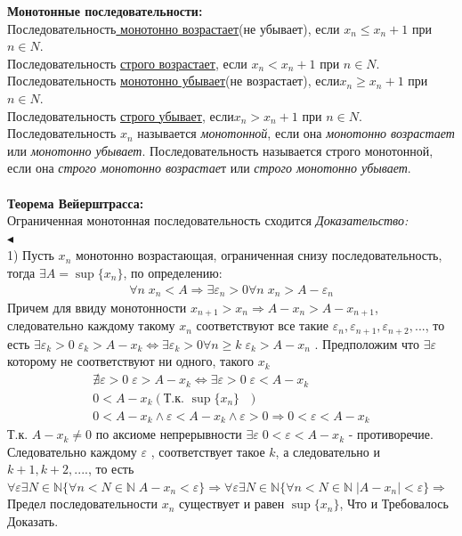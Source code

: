 \textbf{Монотонные последовательности:}\\
Последовательность\underline{ монотонно возрастает}(не убывает), если $ x_n \leqslant x_n+1 $ при $ n \in N $. \\
Последовательность
\underline{строго возрастает}, если $ x_n < x_n+1 $ при $ n \in N $. \\
Последовательность \underline{монотонно убывает}(не возрастает), если$  x_n \geqslant x_n+1 $ при $ n \in N $. \\
Последовательность \underline{строго убывает}, если$  x_n > x_n+1 $ при $ n \in N $. 
\\
Последовательность $ x_n $ называется \textit{монотонной}, если она \textit{монотонно возрастает} или \textit{монотонно
убывает}. Последовательность называется строго монотонной, если она \textit{строго монотонно
возрастае}т или \textit{строго монотонно убывает}.
\\
\\
\textbf{Теорема Вейерштрасса:} \\
Ограниченная монотонная последовательность сходится
\textit{Доказательство:}\\
$\blacktriangleleft$ \\
1) Пусть $ x_n $ монотонно возрастающая, ограниченная снизу последовательность, тогда $ \exists A= \sup \{x_n \}$, по определению:
\begin{align*}
\forall n \; x_n<A\Rightarrow \exists \varepsilon_n>0 \forall n \; x_n>A- \varepsilon_n   
\end{align*}
Причем для ввиду монотонности $ x_{n+1}>x_{n} \Rightarrow A-x_{n}>A-x_{n+1}$, следовательно каждому такому $ x_n $ соответствуют все такие  $ \varepsilon_{n}, \varepsilon_{n+1},\varepsilon_{n+2},...$, то есть $ \exists \varepsilon_k>0 \; \varepsilon_k >A-x_k \Leftrightarrow \exists \varepsilon_k>0 \forall n\geqslant k \;\varepsilon_k >A-x_n $ . Предположим что $ \exists \varepsilon $ которому не соответствуют ни одного, такого $ x_k $
\begin{align*}
\nexists\varepsilon>0 \;  \varepsilon>A-x_k  \Leftrightarrow \exists\varepsilon>0 \;  \varepsilon<A-x_k\\
0<A-x_k(\text{Т.к. $\sup\{ x_n\} $ })\\
0<A-x_k\wedge \varepsilon<A-x_k \wedge \varepsilon>0 \Rightarrow  0<\varepsilon<A-x_k
\end{align*}
Т.к. $ A-x_k\neq 0 $ по аксиоме непрерывности $ \exists \varepsilon  \; 0<\varepsilon<A-x_k$ - противоречие. Следовательно каждому $ \varepsilon $ , соответствует такое $ k $, а следовательно и $ k+1,k+2,.... $, то есть $ \forall \varepsilon \exists N \in \mathbb{N} \{\forall n<N \in \mathbb{N} \; A-x_n<\varepsilon\} \Rightarrow \forall \varepsilon \exists N \in \mathbb{N} \{\forall n<N \in \mathbb{N} \; |A-x_n|<\varepsilon\}\Rightarrow$ Предел последовательности $ x_n $ существует и равен $\sup\{ x_n\}   $, Что и Требовалось Доказать.


